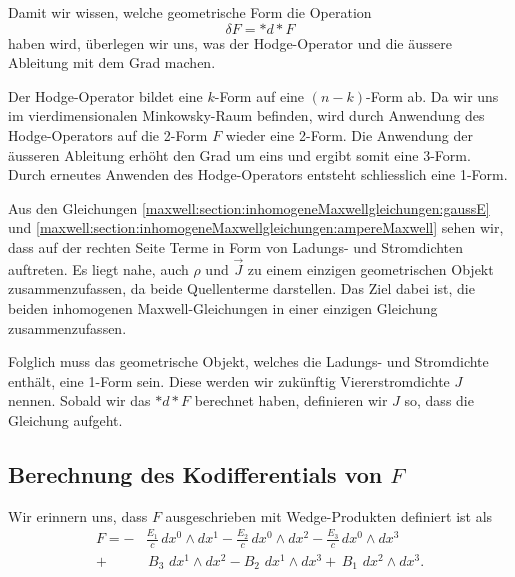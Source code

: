 Damit wir wissen, welche geometrische Form die Operation 
\begin{equation*}
	\delta F = \ast d{\ast} F
\end{equation*}
haben wird, überlegen wir uns, was der Hodge-Operator und die äussere Ableitung mit dem Grad machen.

Der Hodge-Operator bildet eine $k$-Form auf eine $(n-k)$-Form ab.
Da wir uns im vierdimensionalen Minkowsky-Raum befinden, wird durch Anwendung des Hodge-Operators auf die 2-Form $F$ wieder eine 2-Form.
Die Anwendung der äusseren Ableitung erhöht den Grad um eins und ergibt somit eine 3-Form.
Durch erneutes Anwenden des Hodge-Operators entsteht schliesslich eine 1-Form.

Aus den Gleichungen \eqref{maxwell:section:inhomogeneMaxwellgleichungen:gaussE} und \eqref{maxwell:section:inhomogeneMaxwellgleichungen:ampereMaxwell} sehen wir, dass auf der rechten Seite Terme in Form von Ladungs- und Stromdichten auftreten.
Es liegt nahe, auch $\rho$ und $\vec{J}$ zu einem einzigen geometrischen Objekt zusammenzufassen, da beide Quellenterme darstellen.
Das Ziel dabei ist, die beiden inhomogenen Maxwell-Gleichungen in einer einzigen Gleichung zusammenzufassen.

Folglich muss das geometrische Objekt, welches die Ladungs- und Stromdichte enthält, eine 1-Form sein.
Diese werden wir zukünftig Viererstromdichte $J$ nennen.
Sobald wir das $\ast d {\ast} F$ berechnet haben, definieren wir $J$ so, dass die Gleichung aufgeht.

\subsection{Berechnung des Kodifferentials von $F$}

Wir erinnern uns, dass $F$ ausgeschrieben mit Wedge-Produkten definiert ist als
\begin{align*}
	F = 
	- &\frac{E_{1}}{c} \, dx^0 \wedge dx^1 - \frac{E_{2}}{c} \, dx^0 \wedge dx^2 - \frac{E_{3}}{c} \, dx^0 \wedge dx^3 \\
	+ & \, B_3 \, \, dx^1 \wedge dx^2 - B_2 \, \, dx^1 \wedge dx^3 + \, B_1 \, \, dx^2 \wedge dx^3.
\end{align*}

